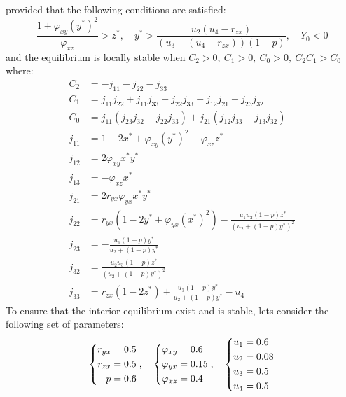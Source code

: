 provided that the following conditions are satisfied:
\begin{equation*}
    \frac{1+\varphi_{xy}\left(y^*\right)^2}{\varphi_{xz}}>z^*,\quad
    y^*>\frac{u_2\left(u_4-r_{zx}\right)}{\left(u_3-\left(u_4-r_{zx}\right)\right)\left(1-p\right)},\quad
    Y_0 < 0
\end{equation*}
and the equilibrium is locally stable when $C_2>0,\ C_1>0,\ C_0>0,\ C_2C_1>C_0$ where:
\begin{align*}
    C_2 &= -j_{11}-j_{22}-j_{33}\\
    C_1 &= j_{11}j_{22}+j_{11}j_{33}+j_{22}j_{33}-j_{12}j_{21}-j_{23}j_{32}\\
    C_0 &= j_{11}\left(j_{23}j_{32}-j_{22}j_{33}\right)+j_{21}\left(j_{12}j_{33}-j_{13}j_{32}\right)\\
    j_{11} &= 1-2x^*+\varphi_{xy}\left(y^*\right)^2-\varphi_{xz}z^*\\
    j_{12} &= 2\varphi_{xy}x^*y^*\\
    j_{13} &= -\varphi_{xz}x^*\\
    j_{21} &= 2r_{yx}\varphi_{yx}x^*y^*\\
    j_{22} &= r_{yx}\left(1-2y^*+\varphi_{yx}\left(x^*\right)^2\right)-\frac{u_1u_2\left(1-p\right)z^*}{\left(u_2+\left(1-p\right)y^*\right)^2}\\
    j_{23} &= -\frac{u_1\left(1-p\right)y^*}{u_2+\left(1-p\right)y^*}\\
    j_{32} &= \frac{u_2u_3\left(1-p\right)z^*}{\left(u_2+\left(1-p\right)y^*\right)^2}\\
    j_{33} &= r_{zx}\left(1-2z^*\right)+\frac{u_3\left(1-p\right)y^*}{u_2+\left(1-p\right)y^*}-u_4
\end{align*}
To ensure that the interior equilibrium exist and is stable, lets consider the following set of parameters:
\begin{equation}\label{params:interior-a}
    \begin{dcases}
        \begin{aligned}
            r_{yx} &= 0.5\\
            r_{zx} &= 0.5\\
            p &= 0.6
        \end{aligned}
    \end{dcases},\quad 
    \begin{dcases}
        \begin{aligned}
            \varphi_{xy} &= 0.6\\
            \varphi_{yx} &= 0.15\\
            \varphi_{xz} &= 0.4
        \end{aligned}
    \end{dcases},\quad
    \begin{dcases}
        \begin{aligned}
            u_1 &= 0.6\\
            u_2 &= 0.08\\
            u_3 &= 0.5\\
            u_4 &= 0.5
        \end{aligned}
    \end{dcases}
\end{equation}
